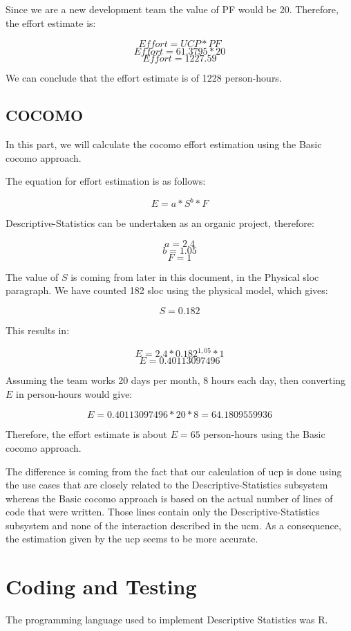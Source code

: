 \documentclass[11pt]{article}
\begin{document}
\newpage

Since we are a new development team the value of PF would be 20.
Therefore, the effort estimate is:

$$ Effort = UCP * PF $$
$$ Effort = 61.3795 * 20 $$
$$ Effort = 1227.59 $$

We can conclude that the effort estimate is of 1228 person-hours.

\newpage

\subsection{COCOMO}

In this part, we will calculate the \gls{cocomo} effort estimation using the Basic \gls{cocomo} approach.

The equation for effort estimation is as follows:

$$ E = a*S^b*F $$ 

Descriptive-Statistics can be undertaken as an organic project, therefore:

$$ a = 2.4 $$
$$ b = 1.05 $$
$$ F = 1 $$

The value of $ S $ is coming from later in this document, in the Physical \gls{sloc} paragraph. We have counted 182 \gls{sloc} using the physical model, which gives:

$$ S = 0.182 $$

This results in:

$$ E = 2.4*0.182^{1,05}*1 $$ 
$$ E = 0.40113097496 $$ 

Assuming the team works 20 days per month, 8 hours each day, then converting $ E $ in person-hours would give:

$$ E = 0.40113097496 * 20 * 8 = 64.1809559936 $$

Therefore, the effort estimate is about $ E = 65 $ person-hours using the Basic \gls{cocomo} approach.\newline

The difference is coming from the fact that our calculation of \gls{ucp} is done using the use cases that are closely related to the Descriptive-Statistics subsystem whereas the Basic \gls{cocomo} approach is based on the actual number of lines of code that were written. Those lines contain only the Descriptive-Statistics subsystem and none of the interaction described in the \gls{ucm}. As a consequence, the estimation given by the \gls{ucp} seems to be more accurate.
\newpage

\section{Coding and Testing}
The programming language used to implement Descriptive Statistics was R.
\end{document}

